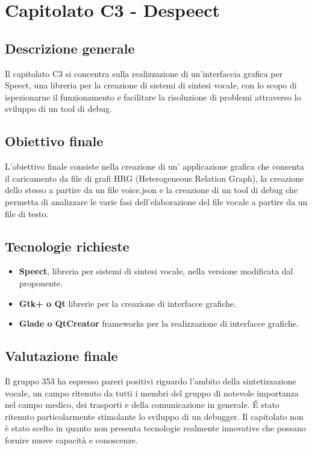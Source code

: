 \documentclass[main.tex]{subfiles}
\begin{document}
\chapter{Capitolato C3 - Despeect}
\section{Descrizione generale}
Il capitolato C3 si concentra sulla realizzazione di un'interfaccia grafica per Speect, una libreria per la creazione di sistemi di sintesi vocale, con lo scopo di ispezionarne il funzionamento e facilitare la risoluzione di problemi attraverso lo sviluppo di un tool di debug. 
\section{Obiettivo finale}
L'obiettivo finale consiste nella creazione di un’ applicazione grafica che consenta il caricamento da file di grafi HRG (Heterogeneous Relation Graph), la creazione dello stesso a partire da un file voice.json e la creazione di un tool di debug che permetta di analizzare le varie fasi dell'elaborazione del file vocale a partire da un file di testo.
\section{Tecnologie richieste}
\begin{itemize}
	\item \textbf{Speect}, libreria per sistemi di sintesi vocale, nella versione modificata dal proponente.
	\item \textbf{Gtk+ o Qt} librerie per la creazione di interfacce grafiche.
	\item \textbf{Glade o QtCreator} frameworks per la realizzazione di interfacce grafiche.
\end{itemize}
\section{Valutazione finale}
Il gruppo 353 ha espresso pareri positivi riguardo l'ambito della sintetizzazione vocale, un campo ritenuto da tutti i membri del gruppo di notevole importanza nel campo medico, dei trasporti e della comunicazione in generale.
\'{E} stato ritenuto particolarmente stimolante lo sviluppo di un debugger.
Il capitolato non è stato scelto in quanto non presenta tecnologie realmente innovative che possano fornire nuove capacità e conoscenze.
\end{document}
